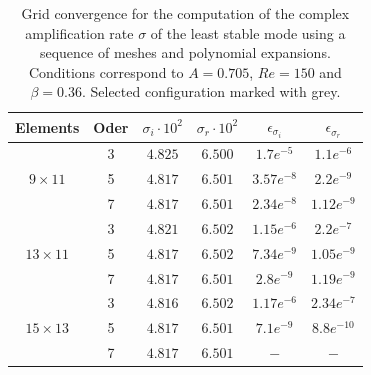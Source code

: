\documentclass[lineno]{jfm}
\begin{document}
 \begin{table}
     \centering
\begin{tabular}{|c|c|c|c|c|c|}
\hline 
 {Elements}        & Oder    & $\sigma_{i}\cdot10^{2}$      &  $\sigma_{r}\cdot10^{2}$ &  $\epsilon_{\sigma_i}$   & $\epsilon_{\sigma_r}$   

                        
\\ \hline
                             & 3    & $4.825$      & $6.500$  &  $1.7e^{-5}$  & $1.1e^{-6}$
\\ \cline{2-6}
                $9 \times11$ & 5    & $4.817$      & $6.501$  &  $3.57e^{-8}$  & $2.2e^{-9}$
\\ \cline{2-6} 
                             & 7    & $4.817$      & $6.501$  &  $2.34e^{-8}$  & $1.12e^{-9}$
\\ \hline



                            & 3    & $4.821$      & $6.502$  &  $1.15e^{-6}$  & $2.2e^{-7}$
\\ \cline{2-6}
\rowcolor{Gray}
                $13\times11$   & 5    & $4.817$      & $6.502$  &  $7.34e^{-9}$  & $1.05e^{-9}$ 
\\ \cline{2-6} 
                              & 7    & $4.817$      & $6.501$  &  $2.8e^{-9}$  & $1.19e^{-9}$
\\ \hline
                            & 3    & $4.816$      & $6.502$  &  $1.17e^{-6}$  & $2.34e^{-7}$
\\ \cline{2-6}
                $15\times13$ & 5    & $4.817$      & $6.501$  &  $7.1e^{-9}$  & $8.8e^{-10}$ 
\\ \cline{2-6} 
                              & 7    & $4.817$      & $6.501$  &  $-$  & $-$
\\ \hline
\end{tabular}
\caption{Grid convergence for the computation of the complex amplification rate $\sigma$ of the least stable mode using a sequence of meshes and polynomial expansions. Conditions correspond to $A=0.705$, $Re=150$ and $\beta=0.36$. Selected configuration marked with grey.}
\label{tab:tab1}
\end{table}




\end{document}
